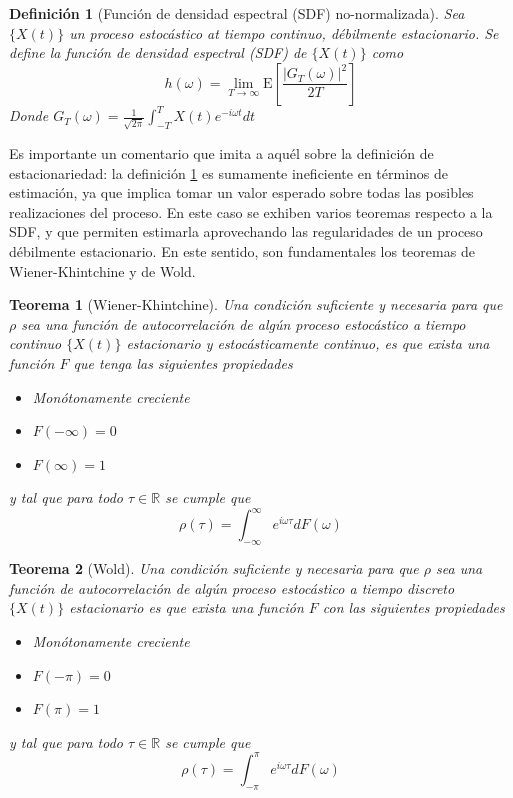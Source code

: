 \documentclass[12pt,a4paper]{mitthesis}
\newtheorem{defn}{Definici\'on}
\newtheorem{thrm}{Teorema}
\newcommand{\R}{\mathbb{R}}
\newcommand{\intR}{\int_{-\infty}^{\infty}}
\newcommand{\intPI}{\int_{-\pi}^{\pi}}
\newcommand{\E}[1]{\mathrm{E}\left[ #1 \right]}
\begin{document}
\begin{defn}[Funci\'on de densidad espectral (SDF) no-normalizada]
Sea $\{X(t)\}$ un proceso estoc\'astico at tiempo continuo, d\'ebilmente estacionario. Se define la 
funci\'on de densidad espectral (SDF) de $\{X(t)\}$ como
\begin{equation*}
h(\omega) = \lim_{T\rightarrow \infty} \E{ \frac{ \left| G_T(\omega) \right|^{2}}{2 T} }
\end{equation*}
Donde $G_T (\omega) = \frac{1}{\sqrt{2 \pi}} \int_{-T}^{T} X(t) e^{-i \omega t} dt$
\label{SDF}
\end{defn}

Es importante un comentario que imita a aqu\'el sobre la definici\'on de estacionariedad: la 
definici\'on \ref{SDF} es sumamente ineficiente en t\'erminos de estimaci\'on, ya que implica tomar 
un valor esperado sobre todas las posibles realizaciones del proceso.
En este caso se exhiben varios teoremas respecto a la SDF, y que permiten estimarla aprovechando 
las regularidades de un proceso d\'ebilmente estacionario. 
En este sentido, son fundamentales los teoremas de Wiener-Khintchine y de Wold.

\begin{thrm}[Wiener-Khintchine]
Una condici\'on suficiente y necesaria para que $\rho$ sea una funci\'on de autocorrelaci\'on de 
alg\'un proceso estoc\'astico a tiempo continuo $\{X(t)\}$ estacionario y estoc\'asticamente 
continuo, es que exista una funci\'on $F$ que tenga las siguientes propiedades
\begin{itemize}
\item Monótonamente creciente
\item $F(-\infty) = 0$
\item $F(\infty) = 1$
\end{itemize}
y tal que para todo $\tau \in \R$ se cumple que
\begin{equation*}
\rho(\tau) = \intR e^{i \omega \tau} dF(\omega)
\end{equation*}
\end{thrm}

\begin{thrm}[Wold]
Una condici\'on suficiente y necesaria para que $\rho$ sea una funci\'on de autocorrelaci\'on de 
alg\'un proceso estoc\'astico a tiempo discreto $\{X(t)\}$ estacionario es que exista una funci\'on 
$F$ con las siguientes propiedades
\begin{itemize}
\item Monótonamente creciente
\item $F(-\pi) = 0$
\item $F(\pi) = 1$
\end{itemize}
y tal que para todo $\tau \in \R$ se cumple que
\begin{equation*}
\rho(\tau) = \intPI e^{i \omega \tau} dF(\omega)
\end{equation*}
\end{thrm}
\end{document}
